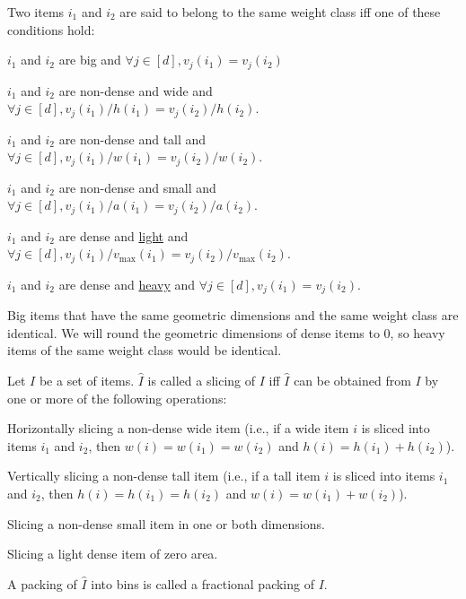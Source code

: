 \begin{definition}
\label{defn:weight-classes}
Two items $i_1$ and $i_2$ are said to belong to the same weight class iff
one of these conditions hold:
\begin{tightemize}
\item $i_1$ and $i_2$ are big and $\forall j \in [d], v_j(i_1) = v_j(i_2)$
\item $i_1$ and $i_2$ are non-dense and wide
    and $\forall j \in [d], v_j(i_1)/h(i_1) = v_j(i_2)/h(i_2)$.
\item $i_1$ and $i_2$ are non-dense and tall
    and $\forall j \in [d], v_j(i_1)/w(i_1) = v_j(i_2)/w(i_2)$.
\item $i_1$ and $i_2$ are non-dense and small
    and $\forall j \in [d], v_j(i_1)/a(i_1) = v_j(i_2)/a(i_2)$.
\item $i_1$ and $i_2$ are dense and \hyperref[defn:heavy-light]{light}
    and $\forall j \in [d], v_j(i_1)/v_{\max}(i_1) = v_j(i_2)/v_{\max}(i_2)$.
\item $i_1$ and $i_2$ are dense and \hyperref[defn:heavy-light]{heavy}
    and $\forall j \in [d], v_j(i_1) = v_j(i_2)$.
\end{tightemize}
\end{definition}

Big items that have the same geometric dimensions and the same weight class are identical.
We will round the geometric dimensions of dense items to 0, so heavy items
of the same weight class would be identical.

\begin{definition}
\label{defn:slicing}
Let $I$ be a set of items. $\widehat{I}$ is called a slicing of $I$ iff
$\widehat{I}$ can be obtained from $I$ by one or more of the following operations:
\begin{tightemize}
\item Horizontally slicing a non-dense wide item
(i.e., if a wide item $i$ is sliced into items $i_1$ and $i_2$, then
$w(i) = w(i_1) = w(i_2)$ and $h(i) = h(i_1) + h(i_2)$).
\item Vertically slicing a non-dense tall item
(i.e., if a tall item $i$ is sliced into items $i_1$ and $i_2$, then
$h(i) = h(i_1) = h(i_2)$ and $w(i) = w(i_1) + w(i_2)$).
\item Slicing a non-dense small item in one or both dimensions.
\item Slicing a light dense item of zero area.
\end{tightemize}

A packing of $\widehat{I}$ into bins is called a fractional packing of $I$.
\end{definition}

